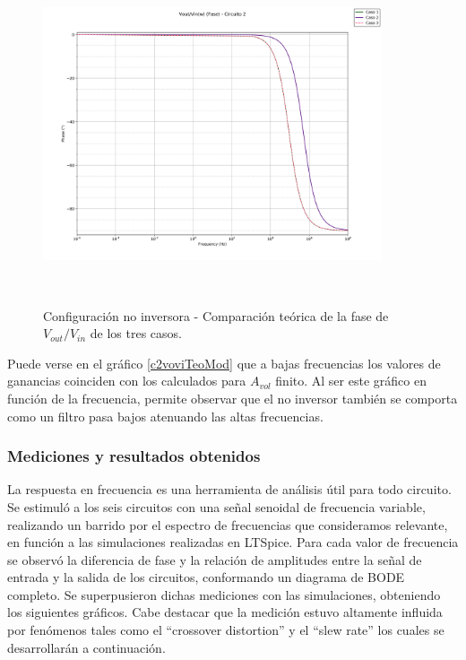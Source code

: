 \begin{figure}[H] %
\centering
\includegraphics[width=10cm,height=10cm,keepaspectratio]{../EJ1/00GRAFICOS/teoricos/circ2vovifasew.png}
\caption{Configuración no inversora - Comparaci\'on te\'orica de la fase de $V_{out}/V_{in}$ de los tres casos.}
\label{c2voviTeoPh}
\end{figure}

Puede verse en el gr\'afico \ref{c2voviTeoMod} que a bajas frecuencias los valores de ganancias coinciden con los calculados para $A_{vol}$ finito. Al ser este gr\'afico en funci\'on de la frecuencia, permite observar que el no inversor tambi\'en se comporta como un filtro pasa bajos atenuando las altas frecuencias.






\subsubsection{Mediciones y resultados obtenidos} %

La respuesta en frecuencia es una herramienta de análisis útil para todo circuito. Se estimuló a los seis circuitos con una se\~nal senoidal de frecuencia variable, realizando un barrido por el espectro de frecuencias que consideramos relevante, en función a las simulaciones realizadas en LTSpice. Para cada valor de frecuencia se observó la diferencia de fase y la relación de amplitudes entre la se\~nal de entrada y la salida de los circuitos, conformando un diagrama de BODE completo. Se superpusieron dichas mediciones con las simulaciones, obteniendo los siguientes gráficos.
Cabe destacar que la medición estuvo altamente influida por fenómenos tales como el “crossover distortion” y el “slew rate” los cuales se desarrollarán a continuación.
